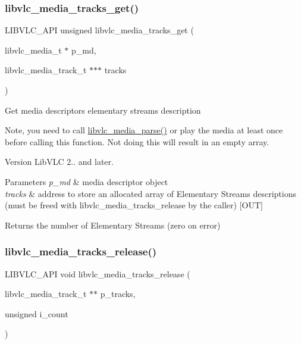 \subsubsection{\texorpdfstring{libvlc\+\_\+media\+\_\+tracks\+\_\+get()}{libvlc\_media\_tracks\_get()}}
{\footnotesize\ttfamily L\+I\+B\+V\+L\+C\+\_\+\+A\+PI unsigned libvlc\+\_\+media\+\_\+tracks\+\_\+get (\begin{DoxyParamCaption}\item[{libvlc\+\_\+media\+\_\+t $\ast$}]{p\+\_\+md,  }\item[{libvlc\+\_\+media\+\_\+track\+\_\+t $\ast$$\ast$$\ast$}]{tracks }\end{DoxyParamCaption})}

Get media descriptor\textquotesingle{}s elementary streams description

Note, you need to call \hyperlink{group__libvlc__media_gad9e48150dcb1a066c51688f6e4a216f1}{libvlc\+\_\+media\+\_\+parse()} or play the media at least once before calling this function. Not doing this will result in an empty array.

\begin{DoxyVersion}{Version}
Lib\+V\+LC 2.. and later.
\end{DoxyVersion}

\begin{DoxyParams}{Parameters}
{\em p\+\_\+md} & media descriptor object \\
\hline
{\em tracks} & address to store an allocated array of Elementary Streams descriptions (must be freed with libvlc\+\_\+media\+\_\+tracks\+\_\+release by the caller) \mbox{[}O\+UT\mbox{]}\\
\hline
\end{DoxyParams}
\begin{DoxyReturn}{Returns}
the number of Elementary Streams (zero on error) 
\end{DoxyReturn}
\mbox{\label{group__libvlc__media_ga9db98f62bb939cc49fbbd227d027850c}} 
\subsubsection{\texorpdfstring{libvlc\+\_\+media\+\_\+tracks\+\_\+release()}{libvlc\_media\_tracks\_release()}}
{\footnotesize\ttfamily L\+I\+B\+V\+L\+C\+\_\+\+A\+PI void libvlc\+\_\+media\+\_\+tracks\+\_\+release (\begin{DoxyParamCaption}\item[{libvlc\+\_\+media\+\_\+track\+\_\+t $\ast$$\ast$}]{p\+\_\+tracks,  }\item[{unsigned}]{i\+\_\+count }\end{DoxyParamCaption})}

